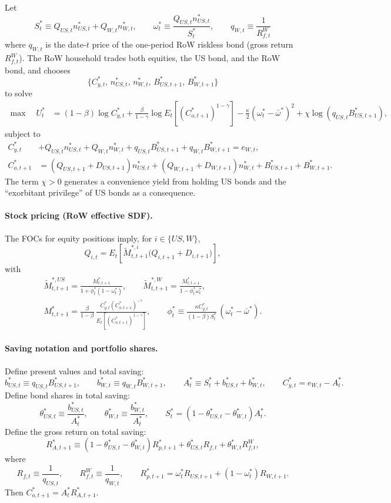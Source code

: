 \documentclass[12pt]{article}
\theoremstyle{plain}
\begin{document}
Let
\[
S_t^* \equiv Q_{US,t}n^*_{US,t}+Q_{W,t}n^*_{W,t},
\qquad
\omega_t^* \equiv \frac{Q_{US,t}n^*_{US,t}}{S_t^*},
\qquad
q_{W,t}\equiv \frac{1}{R_{f,t}^W}
\]
where $q_{W,t}$ is the date-$t$ price of the one-period RoW riskless bond (gross return $R_{f,t}^W$).
The RoW household trades both equities, the US bond, and the RoW bond, and chooses
\[
\{C^*_{y,t},\,n^*_{US,t},\,n^*_{W,t},\,B^*_{US,t+1},\,B^*_{W,t+1}\}
\]
to solve
\begin{align*}
\max\quad U_t^*
&=
(1-\beta)\log C^*_{y,t}
+\frac{\beta}{1-\gamma}\log E_t\!\left[\left(C^*_{o,t+1}\right)^{1-\gamma}\right]
-\frac{\kappa}{2}\left(\omega_t^*-\bar\omega^*\right)^2
+\chi\log\!\left(q_{US,t}B^*_{US,t+1}\right),
\end{align*}
subject to
\begin{align*}
C^*_{y,t}
&+Q_{US,t}n^*_{US,t}+Q_{W,t}n^*_{W,t}
+q_{US,t}B^*_{US,t+1}+q_{W,t}B^*_{W,t+1}
= e_{W,t},\\
C^*_{o,t+1}
&=
(Q_{US,t+1}+D_{US,t+1})n^*_{US,t}
+(Q_{W,t+1}+D_{W,t+1})n^*_{W,t}
+B^*_{US,t+1}+B^*_{W,t+1}.
\end{align*}
The term $\chi>0$ generates a convenience yield from holding US bonds and the ``exorbitant privilege'' of US bonds as a consequence.

\paragraph{Stock pricing (RoW effective SDF).}
The FOCs for equity positions imply, for $i\in\{US,W\}$,
\[
Q_{i,t}
=
E_t\!\left[\tilde M^{*,i}_{t,t+1}\bigl(Q_{i,t+1}+D_{i,t+1}\bigr)\right],
\]
with
\begin{align*}
\tilde M^{*,US}_{t,t+1}=\frac{M^*_{t,t+1}}{1+\phi_t^*(1-\omega_t^*)},
\qquad
\tilde M^{*,W}_{t,t+1}=\frac{M^*_{t,t+1}}{1-\phi_t^*\omega_t^*},\\
M^*_{t,t+1}
=\frac{\beta}{1-\beta}\,
\frac{C^*_{y,t}(C^*_{o,t+1})^{-\gamma}}{E_t\!\left[(C^*_{o,t+1})^{1-\gamma}\right]},
\qquad
\phi_t^* \equiv \frac{\kappa C^*_{y,t}}{(1-\beta)S_t^*}\,(\omega_t^*-\bar\omega^*).
\end{align*}

\paragraph{Saving notation and portfolio shares.}
Define present values and total saving:
\[
b_{US,t}^*\equiv q_{US,t}B^*_{US,t+1},
\qquad
b_{W,t}^*\equiv q_{W,t}B^*_{W,t+1},
\qquad
A_t^*\equiv S_t^*+b_{US,t}^*+b_{W,t}^*,
\qquad
C^*_{y,t}=e_{W,t}-A_t^*.
\]
Define bond shares in total saving:
\[
\theta_{US,t}^*\equiv \frac{b_{US,t}^*}{A_t^*},
\qquad
\theta_{W,t}^*\equiv \frac{b_{W,t}^*}{A_t^*},
\qquad
S_t^*=(1-\theta_{US,t}^*-\theta_{W,t}^*)A_t^*.
\]
Define the gross return on total saving:
\[
R_{A,t+1}^*
\equiv
(1-\theta_{US,t}^*-\theta_{W,t}^*)R_{p,t+1}^*
+\theta_{US,t}^* R_{f,t}
+\theta_{W,t}^* R_{f,t}^W,
\]
where
\[
R_{f,t}\equiv \frac{1}{q_{US,t}},
\qquad
R_{f,t}^W\equiv \frac{1}{q_{W,t}},
\qquad
R_{p,t+1}^*=\omega_t^*R_{US,t+1}+(1-\omega_t^*)R_{W,t+1}.
\]
Then $C^*_{o,t+1}=A_t^*R_{A,t+1}^*$.
\end{document}
